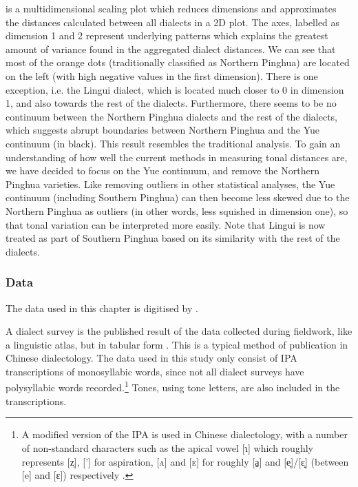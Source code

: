 \documentclass[output=paper, chinesefont]{langscibook}
\begin{document}
 is a multidimensional scaling plot which reduces dimensions and approximates the distances calculated between all dialects in a 2D plot. The axes, labelled as dimension 1 and 2 represent underlying patterns which explains the greatest amount of variance found in the aggregated dialect distances. We can see that most of the orange dots (traditionally classified as Northern Pinghua) are located on the left (with high negative values in the first dimension). There is one exception, i.e. the Lingui dialect, which is located much closer to 0 in dimension 1, and also towards the rest of the dialects. Furthermore, there seems to be no continuum between the Northern Pinghua dialects and the rest of the dialects, which suggests abrupt boundaries between Northern Pinghua and the Yue continuum (in black). 
This result resembles the traditional analysis.
To gain an understanding of how well the current methods in measuring tonal distances are, we have decided to focus on the Yue continuum, and remove the Northern Pinghua varieties.
Like removing outliers in other statistical analyses, the Yue continuum (including Southern Pinghua) can then become less skewed due to the Northern Pinghua as outliers (in other words, less squished in dimension one), so that tonal variation can be interpreted more easily.
Note that Lingui is now treated as part of Southern Pinghua based on its similarity with the rest of the dialects.

\subsubsection{Data}
\label{sec:sung:4.1.3}
The data used in this chapter is digitised by \citet{sung-etal-2024-new}.

A dialect survey is the published result of the data collected during fieldwork, like a linguistic atlas, but in tabular form \citep[105--106]{Francis1983}. This is a typical method of publication in Chinese dialectology. The data used in this study only consist of IPA transcriptions of monosyllabic words, since not all dialect surveys have polysyllabic words recorded.\footnote{A modified version of the IPA is used in Chinese dialectology, with a number of non-standard characters such as the apical vowel [ɿ] which roughly represents [z̩], [’] for aspiration, [\textsc{a}] and [\textsc{e}] for roughly [a̠] and [e̞]/[ɛ̝] (between [e] and [ɛ]) respectively \citep{Handel2015}.} Tones, using  tone letters, are also included in the transcriptions.
\end{document}
